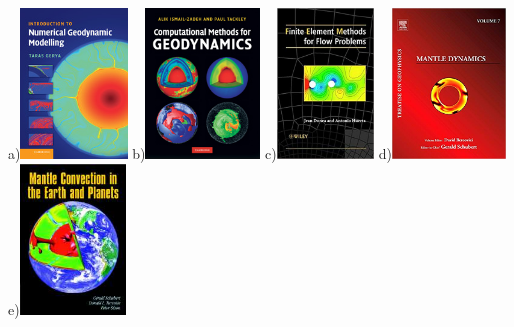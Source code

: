\documentclass[a4paper]{article}
\begin{document}
\begin{center}
a)\includegraphics[height=4cm]{images/literature/gerya_book}
b)\includegraphics[height=4cm]{images/literature/tackley_book}
c)\includegraphics[height=4cm]{images/literature/donea_huerta_book}
d)\includegraphics[height=4cm]{images/literature/bercovici_book}
e)\includegraphics[height=4cm]{images/literature/sto_book}\\
\end{center}
\end{document}

